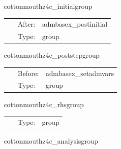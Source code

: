 \vspace{5mm}


\hspace{5mm} cottonmouthz4c\_initialgroup 

\hspace{5mm}{\it z4 initialization routines } 


\hspace{5mm}

 \begin{tabular*}{160mm}{cll} 
~ & After:  & admbasex\_postinitial \\ 
~ & Type:  & group \\ 
\end{tabular*} 


\vspace{5mm}


\hspace{5mm} cottonmouthz4c\_poststepgroup 

\hspace{5mm}{\it z4 post-step routines } 


\hspace{5mm}

 \begin{tabular*}{160mm}{cll} 
~ & Before:  & admbasex\_setadmvars \\ 
~ & Type:  & group \\ 
\end{tabular*} 


\vspace{5mm}


\hspace{5mm} cottonmouthz4c\_rhsgroup 

\hspace{5mm}{\it z4 equations rhs computation } 


\hspace{5mm}

 \begin{tabular*}{160mm}{cll} 
~ & Type:  & group \\ 
\end{tabular*} 


\vspace{5mm}


\hspace{5mm} cottonmouthz4c\_analysisgroup 

